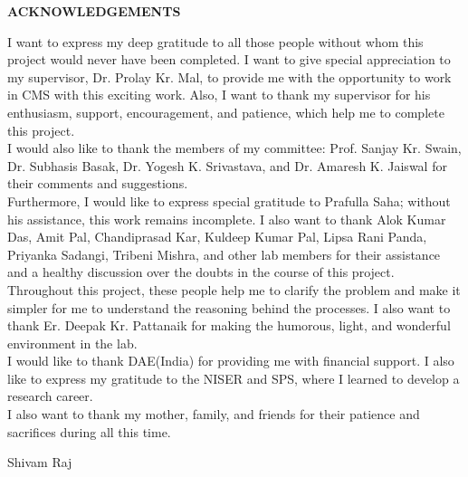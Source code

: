 \begin{center}
{\bf ACKNOWLEDGEMENTS}
\end{center}
I want to express my deep gratitude to all those people without whom this project would never have been completed. I want to give special appreciation to my supervisor, Dr. Prolay Kr. Mal, to provide me with the opportunity to work in CMS with this exciting work. Also, I want to thank my supervisor for his enthusiasm, support, encouragement, and patience, which help me to complete this project.\\
I would also like to thank the members of my committee: Prof. Sanjay Kr. Swain, Dr. Subhasis Basak, Dr. Yogesh K. Srivastava, and Dr. Amaresh K. Jaiswal for their comments and suggestions.\\
Furthermore, I would like to express special gratitude to Prafulla Saha; without his assistance, this work remains incomplete. I also want to thank Alok Kumar Das, Amit Pal, Chandiprasad Kar, Kuldeep Kumar Pal, Lipsa Rani Panda, Priyanka Sadangi, Tribeni Mishra, and other lab members for their assistance and a healthy discussion over the doubts in the course of this project. Throughout this project, these people help me to clarify the problem and make it simpler for me to understand the reasoning behind the processes. I also want to thank Er. Deepak Kr. Pattanaik for making the humorous, light, and wonderful environment in the lab.\\ 
I would like to thank DAE(India) for providing me with financial support. I also like to express my gratitude to the NISER and SPS, where I learned to develop a research career.\\
I also want to thank my mother, family, and friends for their patience and sacrifices during all this time.


 \begin{flushright}
 Shivam Raj 
 \end{flushright}                   


                                           

